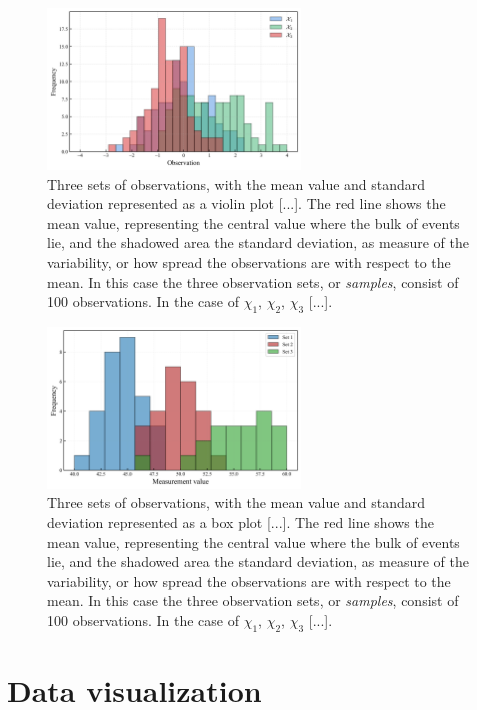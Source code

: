 \documentclass{book}
\begin{document}
\begin{figure}[ht]
    \centering
    \includegraphics[width=0.6\textwidth]{figures/chapter1/mean_std_hist.png}
    \caption{Three sets of observations, with the mean value and standard deviation represented as a violin plot [...]. The red line shows the mean value, representing the central value where the bulk of events lie, and the shadowed area the standard deviation, as measure of the variability, or how spread the observations are with respect to the mean. In this case the three observation sets, or \textit{samples}, consist of 100 observations. In the case of $\chi_1$, $\chi_2$, $\chi_3$ [...].}
    \label{fig:histogram1}
\end{figure}

\begin{figure}[ht]
    \centering
    \includegraphics[width=0.6\textwidth]{figures/chapter1/measurements_histogram.png}
    \caption{Three sets of observations, with the mean value and standard deviation represented as a box plot [...]. The red line shows the mean value, representing the central value where the bulk of events lie, and the shadowed area the standard deviation, as measure of the variability, or how spread the observations are with respect to the mean. In this case the three observation sets, or \textit{samples}, consist of 100 observations. In the case of $\chi_1$, $\chi_2$, $\chi_3$ [...].}
    \label{fig:histogram1}
\end{figure}

\section{Data visualization}
\end{document}
